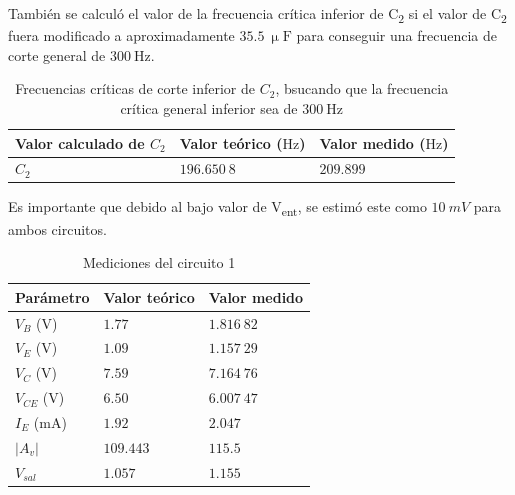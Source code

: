 \documentclass[journal]{IEEEtran}
\begin{document}
También se calculó el valor de la frecuencia crítica inferior de C\textsubscript{2} si el valor de C\textsubscript{2} fuera modificado a aproximadamente $35.5~\upmu\mathrm{F}$ para conseguir una frecuencia de corte
general de $300~\mathrm{Hz}$.

\begin{table}[H]
        \centering
        \renewcommand{\arraystretch}{1.5}
        \caption{Frecuencias críticas de corte inferior de $C_2$, bsucando que la frecuencia crítica general inferior sea de $\mathrm{300~Hz}$}
        \begin{tabular}{ >{\centering\arraybackslash}m{2.5cm} >{\centering\arraybackslash}m{2.5cm} >{\centering\arraybackslash}m{2.5cm} }
                \hline
            Valor calculado de $C_2$ & Valor teórico ($\mathrm{Hz}$) & Valor medido ($\mathrm{Hz}$)\\ 
            \hline
            \centering
            $C_2$ & $196.650~8$  & $209.899$  \\ 
            \hline
        \end{tabular}
        \label{tabla11}
    \end{table}  
Es importante que debido al bajo valor de V\textsubscript{ent}, se estimó este como $10~mV$ para ambos circuitos. 
\begin{table}[H]
        \renewcommand{\arraystretch}{1.5}
        \caption{Mediciones del circuito 1}
        \centering
        \begin{tabular}{ >{\centering\arraybackslash}m{2.5cm} >{\centering\arraybackslash}m{2.5cm} >{\centering\arraybackslash}m{2.5cm} }
                \hline
            Parámetro & Valor teórico & Valor medido\\ 
            \hline
            $V_B$ ($\mathrm{V}$) & $1.77$  & $1.816~82$  \\ 
            $V_E$ ($\mathrm{V}$) & $1.09$  & $1.157~29$  \\
            $V_C$ ($\mathrm{V}$) & $7.59$  & $7.164~76$  \\
            $V_{CE}$ ($\mathrm{V}$) & $6.50$  & $6.007~47$  \\
            $I_E$ ($\mathrm{mA}$) & $1.92$  & $2.047$ \\ 
            $|A_v|$  & $109.443$ & $115.5$  \\
            $V_{sal}$ & $1.057$  & $1.155$ \\
            \hline
        \end{tabular}
        \label{tabla5}
    \end{table}
\end{document}
